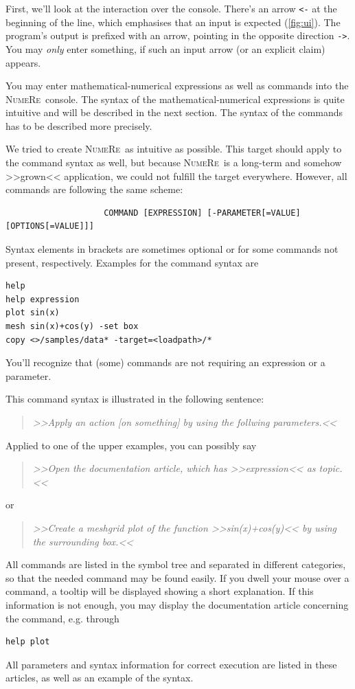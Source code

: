 \documentclass[DIV=14,headsepline,footsepline]{scrbook}
\newcommand{\NR}{\textsc{Nu\-me\-Re}}
\begin{document}
				First, we'll look at the interaction over the console. There's an arrow \lstinline+<-+ at the beginning of the line, which emphasises that an input is expected (\autoref{fig:ui}). The program's output is prefixed with an arrow, pointing in the opposite direction \lstinline+->+. You may \emph{only} enter something, if such an input arrow (or an explicit claim) appears.
				
				You may enter mathematical-numerical expressions as well as commands into the \NR\ console. The syntax of the mathematical-numerical expressions is quite intuitive and will be described in the next section. The syntax of the commands has to be described more precisely.
				
				We tried to create \NR\ as intuitive as possible. This target should apply to the command syntax as well, but because \NR\ is a long-term and somehow >>grown<< application, we could not fulfill the target everywhere. However, all commands are following the same scheme:
				\begin{verbatim}
					COMMAND [EXPRESSION] [-PARAMETER[=VALUE] [OPTIONS[=VALUE]]]
				\end{verbatim}
				Syntax elements in brackets are sometimes optional or for some commands not present, respectively. Examples for the command syntax are
				\begin{lstlisting}
help
help expression
plot sin(x)
mesh sin(x)+cos(y) -set box
copy <>/samples/data* -target=<loadpath>/*
				\end{lstlisting}
				You'll recognize that (some) commands are not requiring an expression or a parameter.
				
				This command syntax is illustrated in the following sentence:
				\begin{quotation}
					\noindent\emph{>>Apply an action [on something] by using the follwing parameters.<<}
				\end{quotation}
				Applied to one of the upper examples, you can possibly say
				\begin{quotation}
					\noindent\emph{>>Open the documentation article, which has >>expression<< as topic.<<}
				\end{quotation}
				or
				\begin{quotation}
					\noindent\emph{>>Create a meshgrid plot of the function >>sin(x)+cos(y)<< by using the surrounding box.<<}
				\end{quotation}
				
				All commands are listed in the symbol tree and separated in different categories, so that the needed command may be found easily. If you dwell your mouse over a command, a tooltip will be displayed showing a short explanation. If this information is not enough, you may display the documentation article concerning the command, e.g. through
				\begin{lstlisting}
help plot
				\end{lstlisting}
				All parameters and syntax information for correct execution are listed in these articles, as well as an example of the syntax.
				
\end{document}
